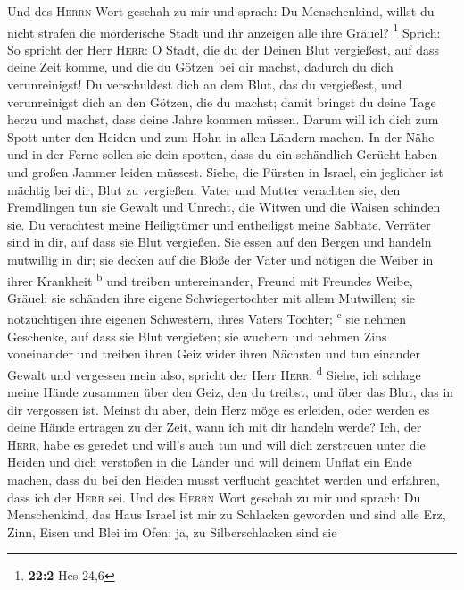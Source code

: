  Und des \textsc{Herrn} Wort geschah zu mir und sprach:
 Du Menschenkind, willst du nicht strafen die mörderische
Stadt und ihr anzeigen alle ihre Gräuel? \footnote{\textbf{22:2} Hes
  24,6}  Sprich: So spricht der Herr \textsc{Herr}: O
Stadt, die du der Deinen Blut vergießest, auf dass deine Zeit komme, und
die du Götzen bei dir machst, dadurch du dich verunreinigst!
 Du verschuldest dich an dem Blut, das du vergießest, und
verunreinigst dich an den Götzen, die du machst; damit bringst du deine
Tage herzu und machst, dass deine Jahre kommen müssen. Darum will ich
dich zum Spott unter den Heiden und zum Hohn in allen Ländern machen.
 In der Nähe und in der Ferne sollen sie dein spotten,
dass du ein schändlich Gerücht haben und großen Jammer leiden müssest.
 Siehe, die Fürsten in Israel, ein jeglicher ist mächtig
bei dir, Blut zu vergießen.  Vater und Mutter verachten
sie, den Fremdlingen tun sie Gewalt und Unrecht, die Witwen und die
Waisen schinden sie.  Du verachtest meine Heiligtümer und
entheiligst meine Sabbate.  Verräter sind in dir, auf dass
sie Blut vergießen. Sie essen auf den Bergen und handeln mutwillig in
dir;  sie decken auf die Blöße der Väter und nötigen die
Weiber in ihrer Krankheit \textsuperscript{b}  und
treiben untereinander, Freund mit Freundes Weibe, Gräuel; sie schänden
ihre eigene Schwiegertochter mit allem Mutwillen; sie notzüchtigen ihre
eigenen Schwestern, ihres Vaters Töchter; \textsuperscript{c}
 sie nehmen Geschenke, auf dass sie Blut vergießen; sie
wuchern und nehmen Zins voneinander und treiben ihren Geiz wider ihren
Nächsten und tun einander Gewalt und vergessen mein also, spricht der
Herr \textsc{Herr}. \textsuperscript{d}  Siehe, ich
schlage meine Hände zusammen über den Geiz, den du treibst, und über das
Blut, das in dir vergossen ist.  Meinst du aber, dein
Herz möge es erleiden, oder werden es deine Hände ertragen zu der Zeit,
wann ich mit dir handeln werde? Ich, der \textsc{Herr}, habe es geredet
und will's auch tun  und will dich zerstreuen unter die
Heiden und dich verstoßen in die Länder und will deinem Unflat ein Ende
machen,  dass du bei den Heiden musst verflucht geachtet
werden und erfahren, dass ich der \textsc{Herr} sei.  Und
des \textsc{Herrn} Wort geschah zu mir und sprach:  Du
Menschenkind, das Haus Israel ist mir zu Schlacken geworden und sind
alle Erz, Zinn, Eisen und Blei im Ofen; ja, zu Silberschlacken sind sie
